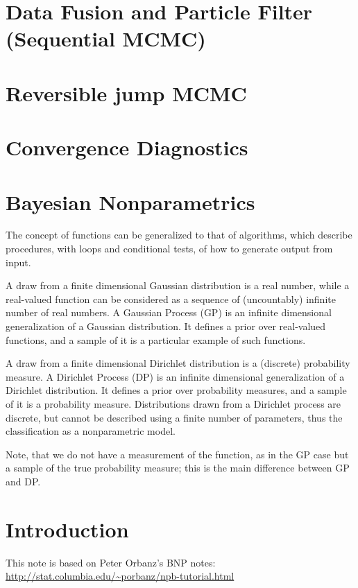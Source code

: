 \section{Data Fusion and Particle Filter (Sequential MCMC)}
\section{Reversible jump MCMC}
\section{Convergence Diagnostics}



\section{Bayesian Nonparametrics}
The concept of functions can be generalized to that of algorithms, which describe procedures, with loops and conditional tests, of how to generate output from input.

A draw from a finite dimensional Gaussian distribution is a real number, while a real-valued function can be considered as a sequence of (uncountably) infinite number of real numbers. A Gaussian Process (GP) is an infinite dimensional generalization of a Gaussian distribution. It defines a prior over real-valued functions, and a sample of it is a particular example of such functions.

A draw from a finite dimensional Dirichlet distribution is a (discrete) probability measure. A Dirichlet Process (DP) is an infinite dimensional generalization of a Dirichlet distribution. It defines a prior over probability measures, and a sample of it is a probability measure.  Distributions drawn from a Dirichlet process are discrete, but cannot be described using a finite number of parameters, thus the classification as a nonparametric model.


Note, that we do not have a measurement of the function, as in the GP case but a sample of the true probability measure; this is the main difference between GP and DP.

\section{Introduction}
This note is based on Peter Orbanz's BNP notes:
\vspace*{5mm}
\\
\url{http://stat.columbia.edu/~porbanz/npb-tutorial.html}

